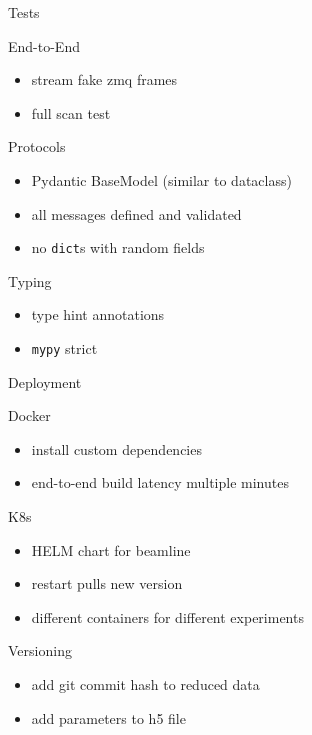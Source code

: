 \documentclass[aspectratio=169]{beamer}
\begin{document}
\begin{frame}{Tests}
 \begin{block}{End-to-End}
  \begin{itemize}
   \item stream fake zmq frames
   \item full scan test
  \end{itemize}

 \end{block}
 \begin{block}{Protocols}
  \begin{itemize}
   \item Pydantic BaseModel (similar to dataclass)
   \item all messages defined and validated
   \item no \texttt{dict}s with random fields
  \end{itemize}
 \end{block}

\begin{block}{Typing}
 \begin{itemize}
 \item type hint annotations
  \item \texttt{mypy} strict
 \end{itemize}

\end{block}


\end{frame}

\begin{frame}{Deployment}
 \begin{block}{Docker}
  \begin{itemize}
   \item install custom dependencies
   \item end-to-end build latency multiple minutes
  \end{itemize}
 \end{block}

 \begin{block}{K8s}
  \begin{itemize}
   \item HELM chart for beamline
   \item restart pulls new version
   \item different containers for different experiments
  \end{itemize}
 \end{block}

\begin{block}{Versioning}
 \begin{itemize}
  \item add git commit hash to reduced data
  \item add parameters to h5 file
 \end{itemize}

\end{block}

\end{frame}
\end{document}

